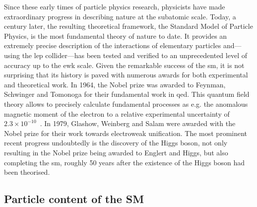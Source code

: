 Since these early times of particle physics research, physicists have made extraordinary progress in describing nature at the subatomic scale. Today, a century later, the resulting theoretical framework, the Standard Model of Particle Physics, is the most fundamental theory of nature to date. It provides an extremely precise description of the interactions of elementary particles and---using the \gls{lep} collider---has been tested and verified to an unprecedented level of accuracy up to the \gls{ewk} scale. Given the remarkable success of the \gls{sm}, it is not surprising that its history is paved with numerous awards for both experimental and theoretical work. In 1964, the Nobel prize was awarded to Feynman, Schwinger and Tomonoga for their fundamental work in \gls{qed}. This quantum field theory allows to precisely calculate fundamental processes as e.g. the anomalous magnetic moment of the electron to a relative experimental uncertainty of $2.3 \times 10^{-10}$~\cite{Mohr:2015ccw}. In 1979, Glashow, Weinberg and Salam were awarded with the Nobel prize for their work towards electroweak unification. The most prominent recent progress undoubtedly is the discovery of the Higgs boson, not only resulting in the Nobel prize being awarded to Englert and Higgs, but also completing the \gls{sm}, roughly 50 years after the existence of the Higgs boson had been theorised. 

		
\subsection{Particle content of the SM}

